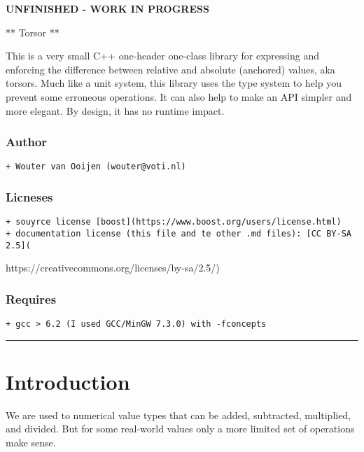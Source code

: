 \documentclass[]{article}
\date{}
\begin{document}
\textbf{UNFINISHED - WORK IN PROGRESS }

** Torsor **

This is a very small C++ one-header one-class library for expressing and
enforcing the difference between relative and absolute (anchored)
values, aka torsors. Much like a unit system, this library uses the type
system to help you prevent some erroneous operations. It can also help
to make an API simpler and more elegant. By design, it has no runtime
impact.

\hypertarget{author}{%
\subsubsection{Author}\label{author}}

\begin{verbatim}
+ Wouter van Ooijen (wouter@voti.nl)
\end{verbatim}

\hypertarget{licneses}{%
\subsubsection{Licneses}\label{licneses}}

\begin{verbatim}
+ souyrce license [boost](https://www.boost.org/users/license.html)
+ documentation license (this file and te other .md files): [CC BY-SA 2.5](
\end{verbatim}

https://creativecommons.org/licenses/by-sa/2.5/)

\hypertarget{requires}{%
\subsubsection{Requires}\label{requires}}

\begin{verbatim}
+ gcc > 6.2 (I used GCC/MinGW 7.3.0) with -fconcepts
\end{verbatim}

\begin{center}\rule{0.5\linewidth}{\linethickness}\end{center}

\hypertarget{introduction}{%
\section{Introduction}\label{introduction}}

We are used to numerical value types that can be added, subtracted,
multiplied, and divided. But for some real-world values only a more
limited set of operations make sense.
\end{document}
